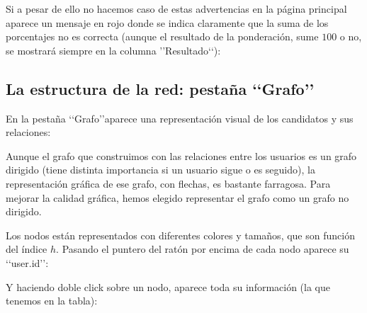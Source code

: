 
Si a pesar de ello no hacemos caso de estas advertencias en la 
página principal aparece un mensaje en rojo donde se indica claramente que la suma 
de los porcentajes no es correcta (aunque el resultado de la ponderación, sume
$100$ o no, se mostrará siempre en la columna \rq\rq  Resultado\lq\lq): 

 


\subsection{La estructura de la red: pestaña \lq\lq Grafo\rq\rq}

En la pestaña \lq\lq Grafo\rq\rq aparece una representación visual de los candidatos 
y sus relaciones:


Aunque el grafo que construimos con las relaciones entre los usuarios es
un grafo dirigido (tiene distinta importancia si un usuario sigue o es seguido),
la representación gráfica de ese grafo, con flechas, es bastante farragosa. 
Para mejorar la calidad gráfica, hemos elegido representar el grafo como 
un grafo no dirigido.
 
Los nodos están representados con diferentes colores y tamaños, que son función del 
índice $h$. Pasando el puntero del ratón por encima de cada nodo aparece su 
\lq\lq user.id\rq\rq:


Y haciendo doble click sobre un nodo, aparece toda su información (la que 
tenemos en la tabla):


